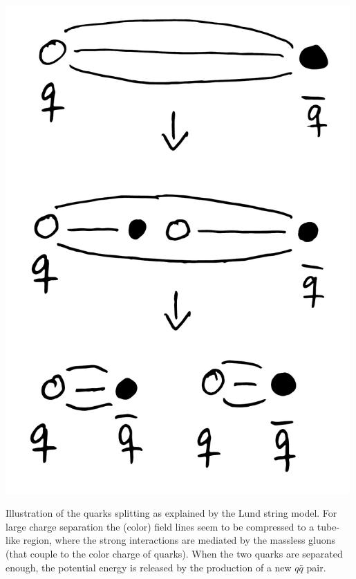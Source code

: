 \begin{marginfigure}
  \centerfloat
  \includegraphics[width=0.99\textwidth]{figures/quark_splitting/quark_splitting.pdf}
  \caption[Quark Splitting]{Illustration of the quarks splitting as explained by the Lund string model. For large charge separation the (color) field lines seem to be compressed to a tube-like region, where the strong interactions are mediated by the massless gluons (that couple to the color charge of quarks). When the two quarks are separated enough, the potential energy is released by the production of a new $q\bar{q}$ pair.}
  \label{fig:hep:quark_splitting_strings}
\end{marginfigure}

